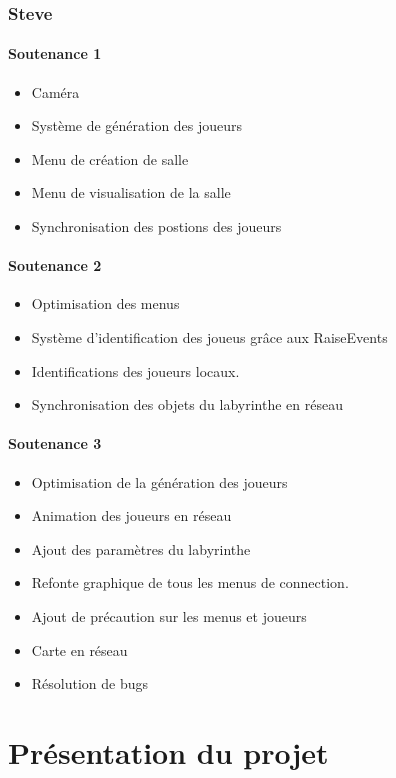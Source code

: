 \documentclass{article}
\begin{document}
\newpage
\subsubsection{Steve}
\paragraph{Soutenance 1}
\begin{itemize}
    \item Caméra
    \item Système de génération des joueurs
    \item Menu de création de salle
    \item Menu de visualisation de la salle
    \item Synchronisation des postions des joueurs
\end{itemize}

\paragraph{Soutenance 2}
\begin{itemize}
    \item Optimisation des menus
    \item Système d'identification des joueus grâce aux RaiseEvents
    \item Identifications des joueurs locaux.
    \item Synchronisation des objets du labyrinthe en réseau
\end{itemize}

\paragraph{Soutenance 3}
\begin{itemize}
    \item Optimisation de la génération des joueurs
    \item Animation des joueurs en réseau
    \item Ajout des paramètres du labyrinthe
    \item Refonte graphique de tous les menus de connection.
    \item Ajout de précaution sur les menus et joueurs
    \item Carte en réseau
    \item Résolution de bugs
\end{itemize}


\newpage
\section{Présentation du projet}
\end{document}
